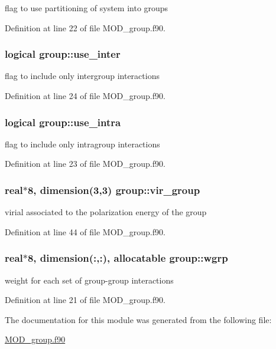 flag to use partitioning of system into groups 



Definition at line 22 of file M\-O\-D\-\_\-group.\-f90.

\hypertarget{classgroup_a4cc36830bfcafdc583968b51277985f5}{
\subsubsection[{use\-\_\-inter}]{\setlength{\rightskip}{0pt plus 5cm}logical group\-::use\-\_\-inter}}\label{classgroup_a4cc36830bfcafdc583968b51277985f5}


flag to include only intergroup interactions 



Definition at line 24 of file M\-O\-D\-\_\-group.\-f90.

\hypertarget{classgroup_a6fac74f906f63346aabc068efa306815}{
\subsubsection[{use\-\_\-intra}]{\setlength{\rightskip}{0pt plus 5cm}logical group\-::use\-\_\-intra}}\label{classgroup_a6fac74f906f63346aabc068efa306815}


flag to include only intragroup interactions 



Definition at line 23 of file M\-O\-D\-\_\-group.\-f90.

\hypertarget{classgroup_ae2b1827e7bd4a7eb5e50155e2fd036a6}{
\subsubsection[{vir\-\_\-group}]{\setlength{\rightskip}{0pt plus 5cm}real$\ast$8, dimension(3,3) group\-::vir\-\_\-group}}\label{classgroup_ae2b1827e7bd4a7eb5e50155e2fd036a6}


virial associated to the polarization energy of the group 



Definition at line 44 of file M\-O\-D\-\_\-group.\-f90.

\hypertarget{classgroup_a8ec57c3684dfb8d832c612fb2d67bfa0}{
\subsubsection[{wgrp}]{\setlength{\rightskip}{0pt plus 5cm}real$\ast$8, dimension(\-:,\-:), allocatable group\-::wgrp}}\label{classgroup_a8ec57c3684dfb8d832c612fb2d67bfa0}


weight for each set of group-\/group interactions 



Definition at line 21 of file M\-O\-D\-\_\-group.\-f90.



The documentation for this module was generated from the following file\-:\begin{DoxyCompactItemize}
\item 
\hyperlink{MOD__group_8f90}{M\-O\-D\-\_\-group.\-f90}\end{DoxyCompactItemize}
